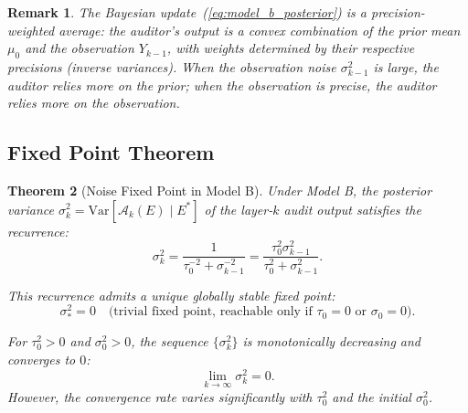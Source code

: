 \documentclass[12pt,a4paper]{article}
\newtheorem{theorem}{Theorem}[section]
\newtheorem{remark}[theorem]{Remark}
\theoremstyle{definition}
\newcommand{\Var}{\mathrm{Var}}
\newcommand{\AuditOp}{\mathcal{A}}
\begin{document}
\begin{remark}
The Bayesian update~(\ref{eq:model_b_posterior}) is a precision-weighted average: the auditor's output is a convex combination of the prior mean $\mu_0$ and the observation $Y_{k-1}$, with weights determined by their respective precisions (inverse variances). When the observation noise $\sigma_{k-1}^2$ is large, the auditor relies more on the prior; when the observation is precise, the auditor relies more on the observation.
\end{remark}

\subsection{Fixed Point Theorem}

\begin{theorem}[Noise Fixed Point in Model B]\label{thm:model_b_fixed_point}
Under Model B, the posterior variance $\sigma_k^2 = \Var[\AuditOp_k(E) \mid E^*]$ of the layer-$k$ audit output satisfies the recurrence:
\begin{equation}\label{eq:model_b_recurrence}
    \sigma_k^2 = \frac{1}{\tau_0^{-2} + \sigma_{k-1}^{-2}} = \frac{\tau_0^2 \sigma_{k-1}^2}{\tau_0^2 + \sigma_{k-1}^2}.
\end{equation}

This recurrence admits a unique globally stable fixed point:
\begin{equation}\label{eq:fixed_point}
    \sigma_*^2 = 0 \quad \text{(trivial fixed point, reachable only if $\tau_0 = 0$ or $\sigma_0 = 0$)}.
\end{equation}

For $\tau_0^2 > 0$ and $\sigma_0^2 > 0$, the sequence $\{\sigma_k^2\}$ is monotonically decreasing and converges to $0$:
\begin{equation}\label{eq:convergence_to_zero}
    \lim_{k \to \infty} \sigma_k^2 = 0.
\end{equation}
However, the convergence rate varies significantly with $\tau_0^2$ and the initial $\sigma_0^2$.
\end{theorem}
\end{document}
